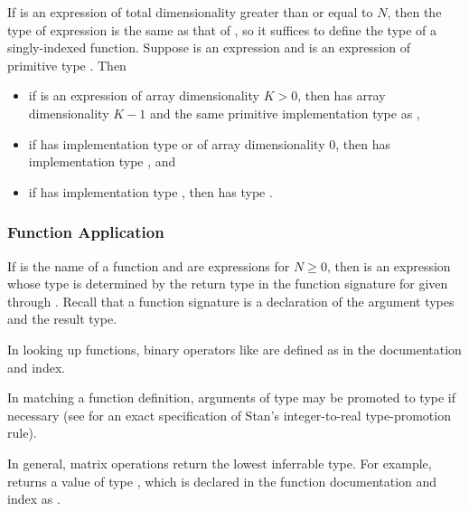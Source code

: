 If  is an expression of total dimensionality greater than or
equal to $N$, then the type of expression  is the
same as that of , so it suffices to define the type
of a singly-indexed function.  Suppose  is an expression and
 is an expression of primitive type .  Then
%
\begin{itemize}
\item if  is an expression of array dimensionality $K > 0$,
  then  has array dimensionality $K-1$ and the same
  primitive implementation type as ,
%
\item if  has implementation type  or
   of array dimensionality 0, then  has
  implementation type , and
%
\item if  has implementation type , then
   has type .
\end{itemize}

\subsubsection{Function Application}

If  is the name of a function and  are
expressions for $N \geq 0$, then  is an expression
whose type is determined by the return type in the function signature
for  given  through .  Recall that a
function signature is a declaration of the argument types and the
result type.  

In looking up functions, binary operators like  are
defined as  in the documentation and index.

In matching a function definition, arguments of type  may be
promoted to type  if necessary (see  for an
exact specification of Stan's integer-to-real type-promotion rule).

In general, matrix operations return the lowest inferrable type.  For
example,  returns a value of type
, which is declared in the function documentation and index
as .


